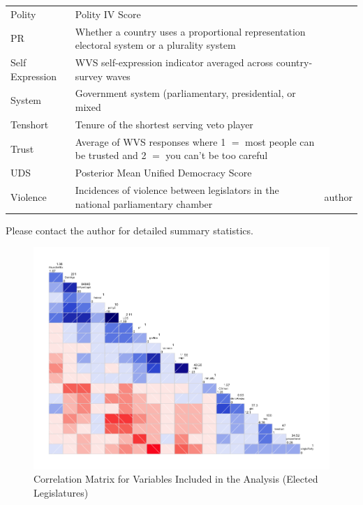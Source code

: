 \documentclass[a4paper]{article}\usepackage{graphicx, color}
\begin{document}
{{\begin{table}[!h]
\begin{center}
\begin{tabular}{l m{7cm} m{3.5cm}}
            Polity & Polity IV Score & \cite{Marshall2009} \\
            PR & Whether a country uses a proportional representation electoral system or a plurality system & \cite{DPI2001} \\
            Self Expression & WVS self-expression indicator averaged across country-survey waves & \cite{WVS2009} \\
            System & Government system (parliamentary, presidential, or mixed & \cite{DPI2001} \\
            Tenshort & Tenure of the shortest serving veto player & \cite{DPI2001} \\
            Trust & Average of WVS responses where 1 $=$ most people can be trusted and 2 $=$ you can't be too careful & \cite{WVS2009} \\
            UDS & Posterior Mean Unified Democracy Score & \cite{Pemstein2010} \\
            Violence & Incidences of violence between legislators in the national parliamentary chamber & author \\
            \hline

    \end{tabular}
    \end{center}
    \begin{singlespace}
        Please contact the author for detailed summary statistics.
    \end{singlespace}
\end{table}  

\begin{landscape}
\begin{figure}[t]
    \caption{Correlation Matrix for Variables Included in the Analysis (Elected Legislatures)}
    \label{corrmatrix}
    \begin{center}
    
    \includegraphics[width = \textwidth]{figure/corScatter.png}  


\end{center}
\end{figure}
\end{landscape}}}
\end{document}

